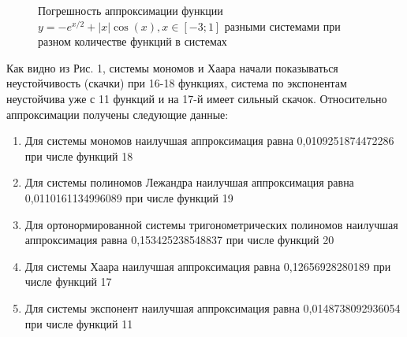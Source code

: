 ﻿\documentclass[a4paper, 12pt]{article}
\begin{document}
\begin{figure}[h!]
    \noindent{}
    \caption{Погрешность аппроксимации функции $y=-e^{x/2}+|x|\cos(x), x\in[-3;1]$ разными системами при разном количестве функций в системах}
    \label{figCurves}
\end{figure}     

Как видно из Рис. 1, системы мономов и Хаара начали показываться неустойчивость (скачки) при 16-18 функциях, система по экспонентам неустойчива уже с 11 функций и на 17-й имеет сильный скачок. Относительно аппроксимации получены следующие данные:

\begin{enumerate}
\item  Для системы мономов наилучшая аппроксимация равна 0,0109251874472286 при числе функций 18

\item  Для системы полиномов Лежандра наилучшая аппроксимация равна 0,0110161134996089 при числе функций 19

\item  Для ортонормированной системы тригонометрических полиномов наилучшая аппроксимация равна 0,153425238548837 при числе функций 20

\item  Для системы Хаара наилучшая аппроксимация равна 0,12656928280189 при числе функций 17

\item  Для системы экспонент наилучшая аппроксимация равна 0,0148738092936054 при числе функций 11
\end{enumerate}
\end{document}
